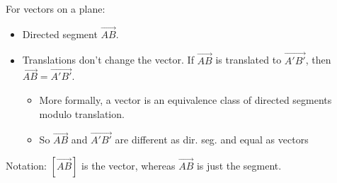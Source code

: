 \documentclass{scrartcl}
\begin{document}
\newpage
For vectors on a plane:
\begin{itemize}
	\item Directed segment $\vec{AB}$.
	\item Translations don't change the vector. If $\vec{AB}$ is translated to $\vec{A'B'}$, then 
	$\vec{AB} = \vec{A'B'}$.
	\begin{itemize}
		\item More formally, a vector is an equivalence class of directed segments modulo translation.
		\item So $\vec{AB}$ and $\vec{A'B'}$ are different as dir. seg. and equal as vectors
	\end{itemize}
\end{itemize}

Notation: $[\vec{AB}]$ is the vector, whereas $\vec{AB}$ is just the segment.
\end{document}
